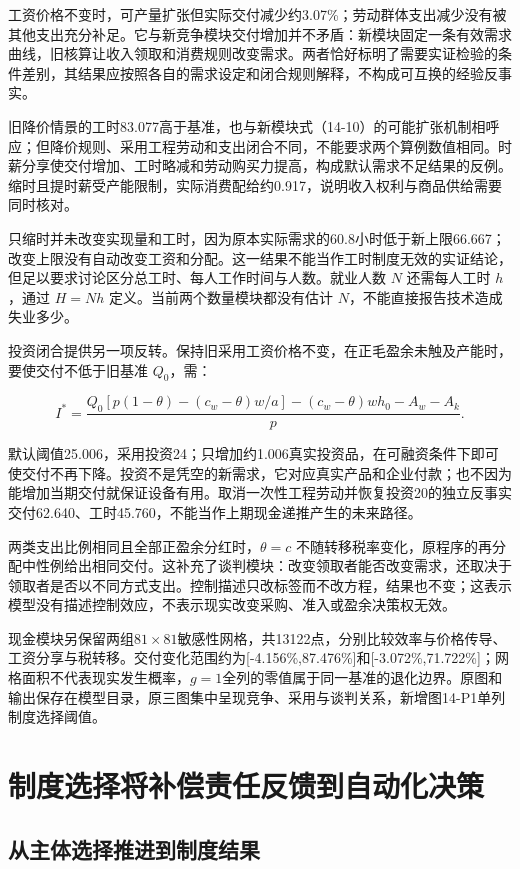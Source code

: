 \documentclass[UTF8,fontset=windows,12pt,a4paper,oneside,openany]{ctexbook}
\begin{document}
工资价格不变时，可产量扩张但实际交付减少约3.07\%；劳动群体支出减少没有被其他支出充分补足。它与新竞争模块交付增加并不矛盾：新模块固定一条有效需求曲线，旧核算让收入领取和消费规则改变需求。两者恰好标明了需要实证检验的条件差别，其结果应按照各自的需求设定和闭合规则解释，不构成可互换的经验反事实。

旧降价情景的工时83.077高于基准，也与新模块式（14-10）的可能扩张机制相呼应；但降价规则、采用工程劳动和支出闭合不同，不能要求两个算例数值相同。时薪分享使交付增加、工时略减和劳动购买力提高，构成默认需求不足结果的反例。缩时且提时薪受产能限制，实际消费配给约0.917，说明收入权利与商品供给需要同时核对。

只缩时并未改变实现量和工时，因为原本实际需求的60.8小时低于新上限66.667；改变上限没有自动改变工资和分配。这一结果不能当作工时制度无效的实证结论，但足以要求讨论区分总工时、每人工作时间与人数。就业人数 \(N\) 还需每人工时 \(h\)，通过 \(H=Nh\) 定义。当前两个数量模块都没有估计 \(N\)，不能直接报告技术造成失业多少。

投资闭合提供另一项反转。保持旧采用工资价格不变，在正毛盈余未触及产能时，要使交付不低于旧基准 \(Q_0\)，需：

\[
I^*=
\frac{Q_0[p(1-\theta)-(c_w-\theta)w/a]
-(c_w-\theta)wh_0-A_w-A_k}{p}.
\tag{14-25}
\]

默认阈值25.006，采用投资24；只增加约1.006真实投资品，在可融资条件下即可使交付不再下降。投资不是凭空的新需求，它对应真实产品和企业付款；也不因为能增加当期交付就保证设备有用。取消一次性工程劳动并恢复投资20的独立反事实交付62.640、工时45.760，不能当作上期现金递推产生的未来路径。

两类支出比例相同且全部正盈余分红时，\(\theta=c\) 不随转移税率变化，原程序的再分配中性例给出相同交付。这补充了谈判模块：改变领取者能否改变需求，还取决于领取者是否以不同方式支出。控制描述只改标签而不改方程，结果也不变；这表示模型没有描述控制效应，不表示现实改变采购、准入或盈余决策权无效。

现金模块另保留两组$81\times81$敏感性网格，共13122点，分别比较效率与价格传导、工资分享与税转移。交付变化范围约为[-4.156\%,87.476\%]和[-3.072\%,71.722\%]；网格面积不代表现实发生概率，$g=1$全列的零值属于同一基准的退化边界。原图和输出保存在模型目录，原三图集中呈现竞争、采用与谈判关系，新增图14-P1单列制度选择阈值。

\section{制度选择将补偿责任反馈到自动化决策}\label{sec:political-automation}

\subsection{从主体选择推进到制度结果}
\end{document}
